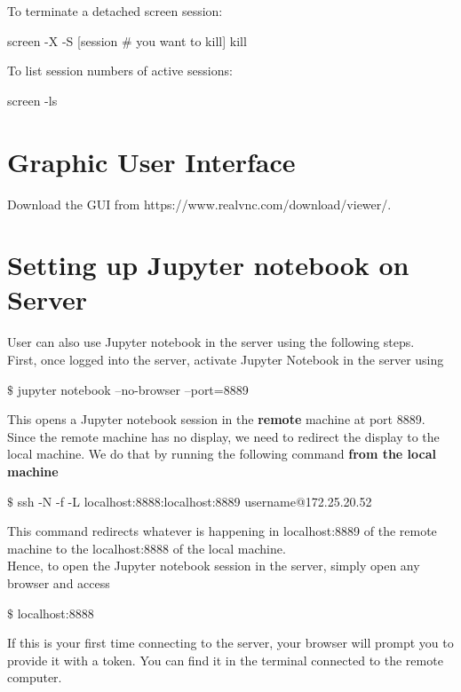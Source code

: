 To terminate a detached screen session:
\begin{mdframed}
screen -X -S [session \# you want to kill] kill
\end{mdframed}

To list session numbers of active sessions:
\begin{mdframed}
screen -ls
\end{mdframed}

\section{Graphic User Interface}

Download the GUI from https://www.realvnc.com/download/viewer/.\\

\section{Setting up Jupyter notebook on Server}
User can also use Jupyter notebook in the server using the following steps.\\

First, once logged into the server, activate Jupyter Notebook in the server using

\begin{framed}
$\$$ jupyter notebook --no-browser --port=8889
\end{framed}

This opens a Jupyter notebook session in the \textbf{remote} machine at port 8889. Since the remote machine has no display, we need to redirect the display to the local machine. We do that by running the following command \textbf{from the local machine}

\begin{framed}
$\$$ ssh -N -f -L localhost:8888:localhost:8889 username@172.25.20.52
\end{framed}

This command redirects whatever is happening in localhost:8889 of the remote machine to the localhost:8888 of the local machine. \\

Hence, to open the Jupyter notebook session in the server, simply open any browser and access

\begin{framed}
$\$$ localhost:8888
\end{framed}

If this is your first time connecting to the server, your browser will prompt you to provide it with a token. You can find it in the terminal connected to the remote computer.

